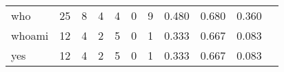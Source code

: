 \begin{longtable}{lp{1.20cm}p{1.20cm}p{1.20cm}p{1.20cm}p{1.20cm}p{1.20cm}p{1.20cm}p{1.20cm}p{1.20cm}p{1.20cm}}
who       &                                    25 &                                                  8 &                                                  4 &                                                  4 &                                                  0 &                                                  9 &                                         0.480 &                                              0.680 &                                              0.360 \\
whoami    &                                    12 &                                                  4 &                                                  2 &                                                  5 &                                                  0 &                                                  1 &                                         0.333 &                                              0.667 &                                              0.083 \\
yes       &                                    12 &                                                  4 &                                                  2 &                                                  5 &                                                  0 &                                                  1 &                                         0.333 &                                              0.667 &                                              0.083 \\
\end{longtable}
